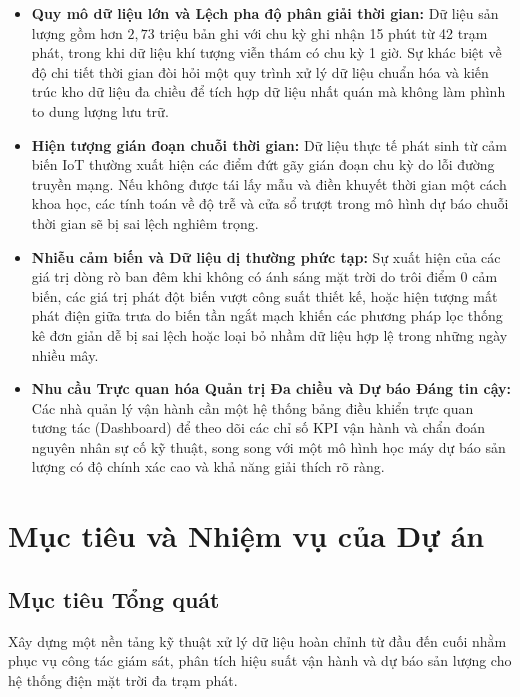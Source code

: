 \documentclass[12pt, a4paper]{report}
\begin{document}
\begin{itemize}[noitemsep]
    \item \textbf{Quy mô dữ liệu lớn và Lệch pha độ phân giải thời gian:} Dữ liệu sản lượng gồm hơn $2{,}73$ triệu bản ghi với chu kỳ ghi nhận 15 phút từ 42 trạm phát, trong khi dữ liệu khí tượng viễn thám có chu kỳ 1 giờ. Sự khác biệt về độ chi tiết thời gian đòi hỏi một quy trình xử lý dữ liệu chuẩn hóa và kiến trúc kho dữ liệu đa chiều để tích hợp dữ liệu nhất quán mà không làm phình to dung lượng lưu trữ.
    \item \textbf{Hiện tượng gián đoạn chuỗi thời gian:} Dữ liệu thực tế phát sinh từ cảm biến IoT thường xuất hiện các điểm đứt gãy gián đoạn chu kỳ do lỗi đường truyền mạng. Nếu không được tái lấy mẫu và điền khuyết thời gian một cách khoa học, các tính toán về độ trễ và cửa sổ trượt trong mô hình dự báo chuỗi thời gian sẽ bị sai lệch nghiêm trọng.
    \item \textbf{Nhiễu cảm biến và Dữ liệu dị thường phức tạp:} Sự xuất hiện của các giá trị dòng rò ban đêm khi không có ánh sáng mặt trời do trôi điểm 0 cảm biến, các giá trị phát đột biến vượt công suất thiết kế, hoặc hiện tượng mất phát điện giữa trưa do biến tần ngắt mạch khiến các phương pháp lọc thống kê đơn giản dễ bị sai lệch hoặc loại bỏ nhầm dữ liệu hợp lệ trong những ngày nhiều mây.
    \item \textbf{Nhu cầu Trực quan hóa Quản trị Đa chiều và Dự báo Đáng tin cậy:} Các nhà quản lý vận hành cần một hệ thống bảng điều khiển trực quan tương tác (Dashboard) để theo dõi các chỉ số KPI vận hành và chẩn đoán nguyên nhân sự cố kỹ thuật, song song với một mô hình học máy dự báo sản lượng có độ chính xác cao và khả năng giải thích rõ ràng.
\end{itemize}

\section{Mục tiêu và Nhiệm vụ của Dự án}
\label{sec:muctieu_nhiemvu}

\subsection{Mục tiêu Tổng quát}
Xây dựng một nền tảng kỹ thuật xử lý dữ liệu hoàn chỉnh từ đầu đến cuối nhằm phục vụ công tác giám sát, phân tích hiệu suất vận hành và dự báo sản lượng cho hệ thống điện mặt trời đa trạm phát.
\end{document}
